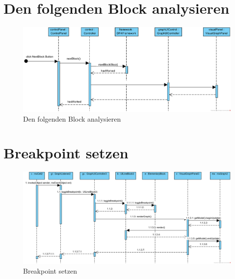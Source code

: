 \section{Den folgenden Block analysieren}
\begin{figure}[!htp]
  \centering
    \includegraphics[width=1\textwidth]{Sequenzdiagramme/NextBlock}
  \caption{Den folgenden Block analysieren}
  \label{fig:nextblock}
\end{figure}
\FloatBarrier
\clearpage

\section{Breakpoint setzen}
\begin{figure}[!htp]
  \centering
    \includegraphics[width=1\textwidth]{Sequenzdiagramme/SetBreakpoint}
  \caption{Breakpoint setzen}
  \label{fig:breakpoint}
\end{figure}
\clearpage
\FloatBarrier